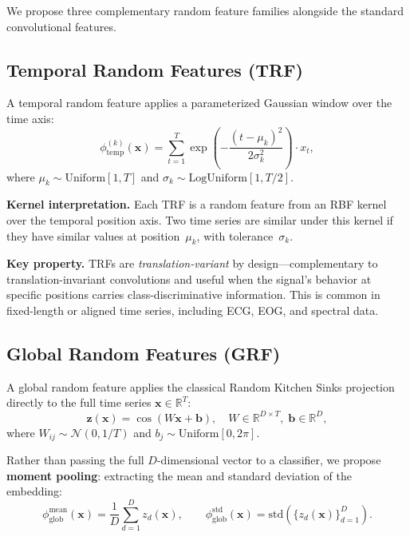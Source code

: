 \documentclass{article}
\begin{document}
We propose three complementary random feature families alongside the standard convolutional features.

\subsection{Temporal Random Features (TRF)}

A temporal random feature applies a parameterized Gaussian window over the time axis:
\begin{equation}
  \phi_{\mathrm{temp}}^{(k)}(\mathbf{x}) = \sum_{t=1}^{T} \exp\!\left(-\frac{(t - \mu_k)^2}{2\sigma_k^2}\right) \cdot x_t,
  \label{eq:trf}
\end{equation}
where $\mu_k \sim \mathrm{Uniform}[1, T]$ and $\sigma_k \sim \mathrm{LogUniform}[1, T/2]$.

\textbf{Kernel interpretation.}
Each TRF is a random feature from an RBF kernel over the temporal position axis.
Two time series are similar under this kernel if they have similar values at position~$\mu_k$, with tolerance~$\sigma_k$.

\textbf{Key property.}
TRFs are \emph{translation-variant} by design---complementary to translation-invariant convolutions and useful when the signal's behavior at specific positions carries class-discriminative information.
This is common in fixed-length or aligned time series, including ECG, EOG, and spectral data.

\subsection{Global Random Features (GRF)}

A global random feature applies the classical Random Kitchen Sinks projection directly to the full time series $\mathbf{x} \in \mathbb{R}^T$:
\begin{equation}
  \mathbf{z}(\mathbf{x}) = \cos(W\mathbf{x} + \mathbf{b}), \quad W \in \mathbb{R}^{D \times T},\; \mathbf{b} \in \mathbb{R}^D,
\end{equation}
where $W_{ij} \sim \mathcal{N}(0, 1/T)$ and $b_j \sim \mathrm{Uniform}[0, 2\pi]$.

Rather than passing the full $D$-dimensional vector to a classifier, we propose \textbf{moment pooling}: extracting the mean and standard deviation of the embedding:
\begin{equation}
  \phi_{\mathrm{glob}}^{\mathrm{mean}}(\mathbf{x}) = \frac{1}{D}\sum_{d=1}^{D} z_d(\mathbf{x}), \qquad
  \phi_{\mathrm{glob}}^{\mathrm{std}}(\mathbf{x}) = \mathrm{std}\!\left(\{z_d(\mathbf{x})\}_{d=1}^D\right).
  \label{eq:grf}
\end{equation}
\end{document}
